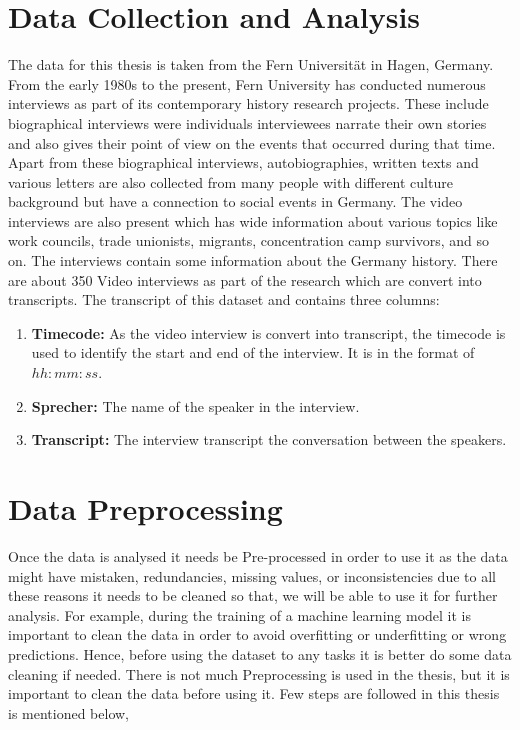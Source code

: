 \section{Data Collection and Analysis}

The data for this thesis is taken from the Fern Universität in Hagen, Germany. From the early 1980s to the present, 
Fern University has conducted numerous interviews as part of its contemporary history research projects. These include 
biographical interviews were individuals interviewees narrate their own stories and also gives their point of view on 
the events that occurred during that time. Apart from these biographical interviews, autobiographies, written texts and 
various letters are also collected from many people with different culture background but have a connection to social events 
in Germany. The video interviews are also present which has wide information about various topics like work councils, trade 
unionists, migrants, concentration camp survivors, and so on. The interviews contain some information
about the Germany history. There are about 350 Video interviews as part of the research which are convert into transcripts. 
The transcript of this dataset and contains three columns:

\begin{enumerate}
    \item\textbf{Timecode:} As the video interview is convert into transcript, the timecode is used to identify the 
    start and end of the interview. It is in the format of $hh:mm:ss$.
    \item\textbf{Sprecher:}  The name of the speaker in the interview.
    \item\textbf{Transcript:}  The interview transcript the conversation between the speakers.
\end{enumerate}
\section{Data Preprocessing}

Once the data is analysed it needs be Pre-processed in order to use it as the data might have mistaken, redundancies, 
missing values, or inconsistencies due to all these reasons it needs to be cleaned so that, we will be able to use it for 
further analysis. For example, during the training of a machine learning model it is important to clean the data in order 
to avoid overfitting or underfitting or wrong predictions. Hence, before using the dataset to any tasks it is better do some 
data cleaning if needed. There is not much Preprocessing is used in the thesis, but it is important to clean the data before 
using it. Few steps are followed in this thesis is mentioned below,

